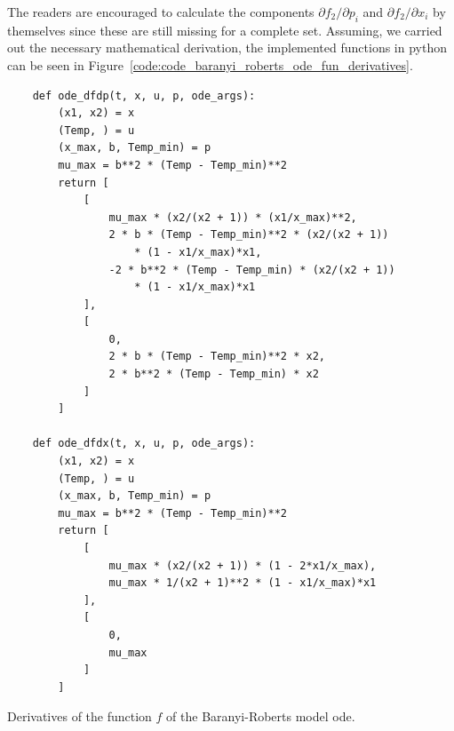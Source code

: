 \documentclass[10pt,A4paper]{article}
\begin{document}
The readers are encouraged to calculate the components $\partial f_2/\partial p_i$ and $\partial f_2/\partial x_i$ by themselves since these are still missing for a complete set.
Assuming, we carried out the necessary mathematical derivation, the implemented functions in python can be seen in Figure~\ref{code:code_baranyi_roberts_ode_fun_derivatives}.
\begin{code}[H]
    \begin{verbatim}
    def ode_dfdp(t, x, u, p, ode_args):
        (x1, x2) = x
        (Temp, ) = u
        (x_max, b, Temp_min) = p
        mu_max = b**2 * (Temp - Temp_min)**2
        return [
            [
                mu_max * (x2/(x2 + 1)) * (x1/x_max)**2,
                2 * b * (Temp - Temp_min)**2 * (x2/(x2 + 1))
                    * (1 - x1/x_max)*x1,
                -2 * b**2 * (Temp - Temp_min) * (x2/(x2 + 1))
                    * (1 - x1/x_max)*x1
            ],
            [
                0,
                2 * b * (Temp - Temp_min)**2 * x2,
                2 * b**2 * (Temp - Temp_min) * x2
            ] 
        ]

    def ode_dfdx(t, x, u, p, ode_args):
        (x1, x2) = x
        (Temp, ) = u
        (x_max, b, Temp_min) = p
        mu_max = b**2 * (Temp - Temp_min)**2
        return [
            [
                mu_max * (x2/(x2 + 1)) * (1 - 2*x1/x_max),
                mu_max * 1/(x2 + 1)**2 * (1 - x1/x_max)*x1
            ], 
            [
                0,
                mu_max
            ]
        ]
    \end{verbatim}
    \caption{Derivatives of the function $f$ of the Baranyi-Roberts model \ac{ode}.}
    \label{code:code_baranyi_roberts_ode_fun_derivatives}
\end{code}
%
\end{document}
